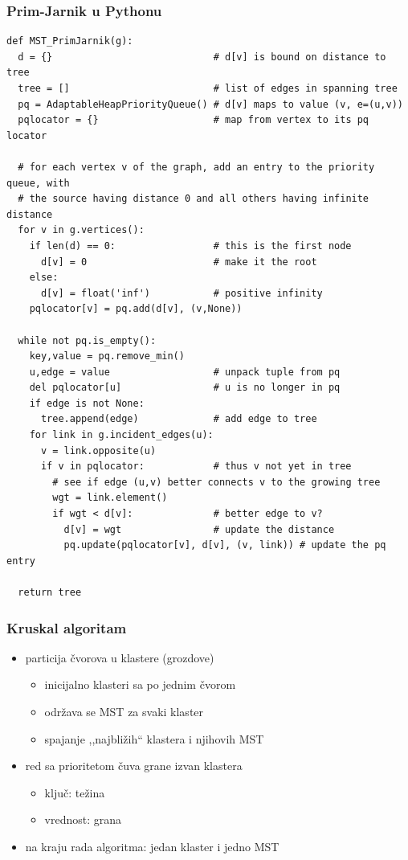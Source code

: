 \documentclass[compress,aspectratio=169]{beamer}
\begin{document}
\begin{frame}
  \frametitle{Prim-Jarnik u Pythonu}
\begin{verbatim}
def MST_PrimJarnik(g):
  d = {}                            # d[v] is bound on distance to tree
  tree = []                         # list of edges in spanning tree
  pq = AdaptableHeapPriorityQueue() # d[v] maps to value (v, e=(u,v))
  pqlocator = {}                    # map from vertex to its pq locator

  # for each vertex v of the graph, add an entry to the priority queue, with
  # the source having distance 0 and all others having infinite distance
  for v in g.vertices():
    if len(d) == 0:                 # this is the first node
      d[v] = 0                      # make it the root
    else:
      d[v] = float('inf')           # positive infinity
    pqlocator[v] = pq.add(d[v], (v,None))

  while not pq.is_empty():
    key,value = pq.remove_min()
    u,edge = value                  # unpack tuple from pq
    del pqlocator[u]                # u is no longer in pq
    if edge is not None:
      tree.append(edge)             # add edge to tree
    for link in g.incident_edges(u):
      v = link.opposite(u)
      if v in pqlocator:            # thus v not yet in tree
        # see if edge (u,v) better connects v to the growing tree
        wgt = link.element()
        if wgt < d[v]:              # better edge to v?
          d[v] = wgt                # update the distance
          pq.update(pqlocator[v], d[v], (v, link)) # update the pq entry

  return tree
\end{verbatim}
\end{frame}

\begin{frame}[fragile]
  \frametitle{Kruskal algoritam}
  \begin{itemize}
    \item particija čvorova u klastere (grozdove)
    \begin{itemize}
      \item inicijalno klasteri sa po jednim čvorom
      \item održava se MST za svaki klaster
      \item spajanje ,,najbližih`` klastera i njihovih MST
    \end{itemize}
    \item red sa prioritetom čuva grane izvan klastera
    \begin{itemize}
      \item ključ: težina
      \item vrednost: grana
    \end{itemize}
    \item na kraju rada algoritma: jedan klaster i jedno MST
  \end{itemize}
\end{frame}
\end{document}
